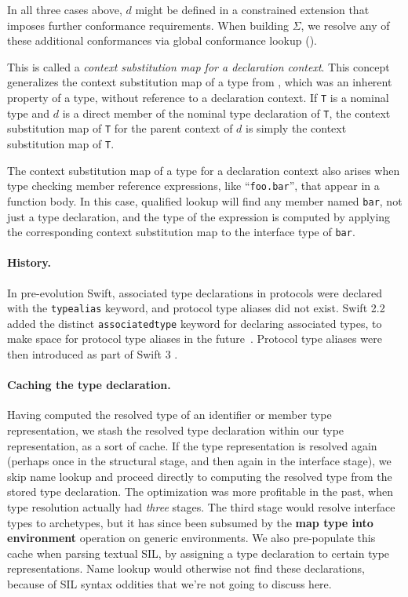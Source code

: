 \documentclass[../generics]{subfiles}
\begin{document}
In all three cases above, $d$ might be defined in a constrained extension that imposes further conformance requirements. When building $\Sigma$, we resolve any of these additional conformances via global conformance lookup ().

This is called a  \emph{context substitution map for a declaration context}. This concept generalizes the context substitution map of a type from , which was an inherent property of a type, without reference to a declaration context. If \texttt{T} is a nominal type and $d$ is a direct member of the nominal type declaration of \texttt{T}, the context substitution map of \texttt{T} for the parent context of $d$ is simply the context substitution map of \texttt{T}.

The context substitution map of a type for a declaration context also arises when type checking member reference expressions, like ``\texttt{foo.bar}'', that appear in a function body. In this case, qualified lookup will find any member named \texttt{bar}, not just a type declaration, and the type of the expression is computed by applying the corresponding context substitution map to the interface type of \texttt{bar}.

\paragraph{History.} In pre-evolution Swift, associated type declarations in protocols were declared with the \texttt{typealias} keyword, and protocol type aliases did not exist. Swift 2.2 added the distinct \texttt{associatedtype} keyword for declaring associated types, to make space for protocol type aliases in the future~\cite{se0011}. Protocol type aliases were then introduced as part of Swift 3 \cite{se0092}.

\paragraph{Caching the type declaration.} Having computed the resolved type of an identifier or member type representation, we stash the resolved type declaration within our type representation, as a sort of cache. If the type representation is resolved again (perhaps once in the structural stage, and then again in the interface stage), we skip name lookup and proceed directly to computing the resolved type from the stored type declaration. The optimization was more profitable in the past, when type resolution actually had \emph{three} stages. The third stage would resolve interface types to archetypes, but it has since been subsumed by the \textbf{map type into environment} operation on generic environments. We also pre-populate this cache when parsing textual SIL, by assigning a type declaration to certain type representations. Name lookup would otherwise not find these declarations, because of SIL syntax oddities that we're not going to discuss here.
\end{document}
